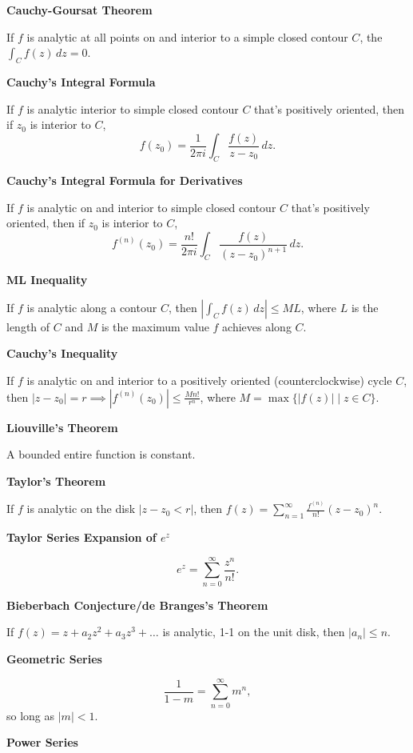 \documentclass{article}
\begin{document}
\medskip\noindent\textbf{Cauchy-Goursat Theorem}

    If $f$ is analytic at all points on and interior to a simple closed contour $C$, the  $\int_Cf(z)\,dz=0$.

\medskip\noindent\textbf{Cauchy's Integral Formula}

    If $f$ is analytic interior to simple closed contour $C$ that's positively oriented, then if $z_0$ is interior to $C$, $$f(z_0) = \frac1{2\pi i}\int_C\frac{f(z)}{z-z_0}\,dz.$$

\medskip\noindent\textbf{Cauchy's Integral Formula for Derivatives}

    If $f$ is analytic on and interior to simple closed contour $C$ that's positively oriented, then if $z_0$ is interior to $C$, $$f^{(n)}(z_0) = \frac{n!}{2\pi i}\int_C\frac{f(z)}{(z-z_0)^{n+1}}\,dz.$$

\medskip\noindent\textbf{ML Inequality}

    If $f$ is analytic along a contour $C$, then $\left|\int_C f(z) \, dz\right| \leq ML$, where $L$ is the length of $C$ and $M$ is the maximum value $f$ achieves along $C$.

\medskip\noindent\textbf{Cauchy's Inequality}

    If $f$ is analytic on and interior to a positively oriented (counterclockwise) cycle $C$, then $|z-z_0| = r \implies |f^{(n)}(z_0)| \leq \frac{Mn!}{r^n}$, where $M = \max\{|f(z)| \mid z \in C\}$.

\medskip\noindent\textbf{Liouville's Theorem}

    A bounded entire function is constant.

\medskip\noindent\textbf{Taylor's Theorem}

    If $f$ is analytic on the disk $|z-z_0 < r|$, then $f(z) = \sum_{n=1}^\infty\frac{f^{(n)}}{n!}(z-z_0)^n$.
    
\medskip\noindent\textbf{Taylor Series Expansion of $e^z$}

    $$e^z = \sum_{n=0}^\infty \frac{z^n}{n!}.$$

\medskip\noindent\textbf{Bieberbach Conjecture/de Branges's Theorem}

    If $f(z) = z + a_2z^2 + a_3z^3 + \hdots$ is analytic, 1-1 on the unit disk, then $|a_n| \leq n$.

\medskip\noindent\textbf{Geometric Series}

    $$\frac1{1-m} = \sum_{n=0}^\infty m^n,$$ so long as $|m| < 1$.

\medskip\noindent\textbf{Power Series}
\end{document}
